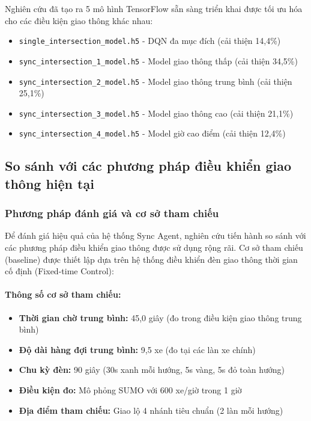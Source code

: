Nghiên cứu đã tạo ra 5 mô hình TensorFlow sẵn sàng triển khai được tối ưu hóa cho các điều kiện giao thông khác nhau:

\begin{itemize}
            \item \texttt{single\_intersection\_model.h5} - DQN đa mục đích (cải thiện 14,4\%)
    \item \texttt{sync\_intersection\_1\_model.h5} - Model giao thông thấp (cải thiện 34,5\%)
    \item \texttt{sync\_intersection\_2\_model.h5} - Model giao thông trung bình (cải thiện 25,1\%)  
    \item \texttt{sync\_intersection\_3\_model.h5} - Model giao thông cao (cải thiện 21,1\%)
    \item \texttt{sync\_intersection\_4\_model.h5} - Model giờ cao điểm (cải thiện 12,4\%)
\end{itemize}

\subsection{So sánh với các phương pháp điều khiển giao thông hiện tại}

\subsubsection{Phương pháp đánh giá và cơ sở tham chiếu}

Để đánh giá hiệu quả của hệ thống Sync Agent, nghiên cứu tiến hành so sánh với các phương pháp điều khiển giao thông được sử dụng rộng rãi. Cơ sở tham chiếu (baseline) được thiết lập dựa trên hệ thống điều khiển đèn giao thông thời gian cố định (Fixed-time Control):

\paragraph{Thông số cơ sở tham chiếu:}
\begin{itemize}
    \item \textbf{Thời gian chờ trung bình:} 45,0 giây (đo trong điều kiện giao thông trung bình)
    \item \textbf{Độ dài hàng đợi trung bình:} 9,5 xe (đo tại các làn xe chính)
    \item \textbf{Chu kỳ đèn:} 90 giây (30s xanh mỗi hướng, 5s vàng, 5s đỏ toàn hướng)
    \item \textbf{Điều kiện đo:} Mô phỏng SUMO với 600 xe/giờ trong 1 giờ
    \item \textbf{Địa điểm tham chiếu:} Giao lộ 4 nhánh tiêu chuẩn (2 làn mỗi hướng)
\end{itemize}


